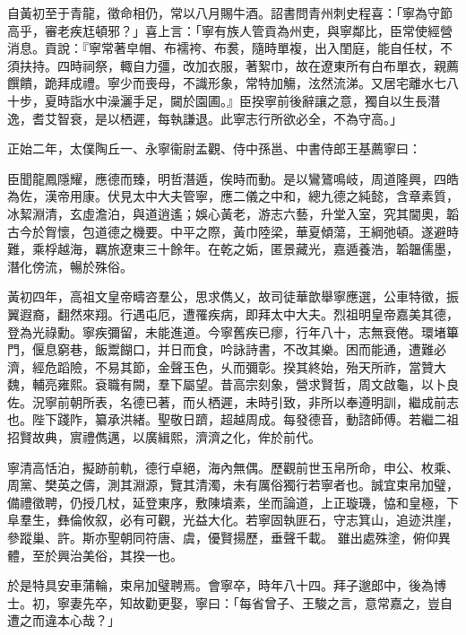 \begin{pinyinscope}
自黃初至于青龍，徵命相仍，常以八月賜牛酒。詔書問青州刺史程喜：「寧為守節高乎，審老疾尪頓邪？」喜上言：「寧有族人管貢為州吏，與寧鄰比，臣常使經營消息。貢說：『寧常著皁帽、布襦袴、布裠，隨時單複，出入閨庭，能自任杖，不須扶持。四時祠祭，輙自力彊，改加衣服，著絮巾，故在遼東所有白布單衣，親薦饌饋，跪拜成禮。寧少而喪母，不識形象，常特加觴，泫然流涕。又居宅離水七八十步，夏時詣水中澡灑手足，闚於園圃。』臣揆寧前後辭讓之意，獨自以生長潛逸，耆艾智衰，是以栖遲，每執謙退。此寧志行所欲必全，不為守高。」




正始二年，太僕陶丘一、永寧衞尉孟觀、侍中孫邕、中書侍郎王基薦寧曰：




臣聞龍鳳隱耀，應德而臻，明哲潛遁，俟時而動。是以鸞鷟鳴岐，周道隆興，四皓為佐，漢帝用康。伏見太中大夫管寧，應二儀之中和，總九德之純懿，含章素質，冰絜淵清，玄虛澹泊，與道逍遙；娛心黃老，游志六藝，升堂入室，究其閫奧，韜古今於胷懷，包道德之機要。中平之際，黃巾陸梁，華夏傾蕩，王綱弛頓。遂避時難，乘桴越海，羈旅遼東三十餘年。在乾之姤，匿景藏光，嘉遁養浩，韜韞儒墨，潛化傍流，暢於殊俗。




黃初四年，高祖文皇帝疇咨羣公，思求儁乂，故司徒華歆舉寧應選，公車特徵，振翼遐裔，翻然來翔。行遇屯厄，遭罹疾病，即拜太中大夫。烈祖明皇帝嘉美其德，登為光祿勳。寧疾彌留，未能進道。今寧舊疾已瘳，行年八十，志無衰倦。環堵篳門，偃息窮巷，飯鬻餬口，并日而食，吟詠詩書，不改其樂。困而能通，遭難必濟，經危蹈險，不易其節，金聲玉色，乆而彌彰。揆其終始，殆天所祚，當贊大魏，輔亮雍熙。袞職有闕，羣下屬望。昔高宗刻象，營求賢哲，周文啟龜，以卜良佐。況寧前朝所表，名德已著，而乆栖遲，未時引致，非所以奉遵明訓，繼成前志也。陛下踐阼，纂承洪緒。聖敬日躋，超越周成。每發德音，動諮師傅。若繼二祖招賢故典，賔禮儁邁，以廣緝熙，濟濟之化，侔於前代。


寧清高恬泊，擬跡前軌，德行卓絕，海內無偶。歷觀前世玉帛所命，申公、枚乘、周黨、樊英之儔，測其淵源，覽其清濁，未有厲俗獨行若寧者也。誠宜束帛加璧，備禮徵聘，仍授几杖，延登東序，敷陳墳素，坐而論道，上正璇璣，恊和皇極，下阜羣生，彝倫攸叙，必有可觀，光益大化。若寧固執匪石，守志箕山，追迹洪崖，參蹤巢、許。斯亦聖朝同符唐、虞，優賢揚歷，垂聲千載。
雖出處殊塗，俯仰異體，至於興治美俗，其揆一也。


於是特具安車蒲輪，束帛加璧聘焉。會寧卒，時年八十四。拜子邈郎中，後為博士。初，寧妻先卒，知故勸更娶，寧曰：「每省曾子、王駿之言，意常嘉之，豈自遭之而違本心哉？」



\end{pinyinscope}
